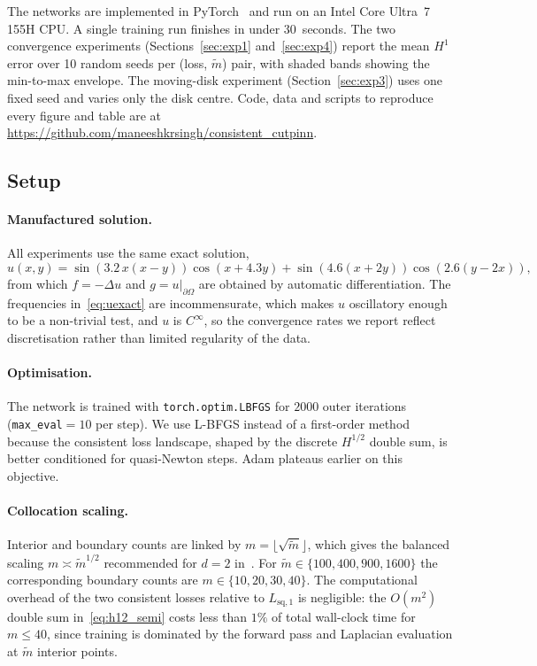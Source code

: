 \documentclass[11pt]{article}
\newcommand{\bOmg}{\partial\Omega}
\newcommand{\mtil}{\widetilde{m}}
\begin{document}
The networks are implemented in PyTorch~\cite{paszke2019pytorch}
and run on an Intel Core Ultra~7 155H CPU. A single training run
finishes in under $30$~seconds. The two convergence experiments
(Sections~\ref{sec:exp1} and~\ref{sec:exp4}) report the mean $H^1$
error over 10 random seeds per (loss, $\mtil$) pair, with shaded
bands showing the min-to-max envelope. The moving-disk experiment
(Section~\ref{sec:exp3}) uses one fixed seed and varies only the
disk centre. Code, data and scripts to reproduce every figure and
table are at
\url{https://github.com/maneeshkrsingh/consistent_cutpinn}.


\subsection{Setup}
\label{sec:setup}

\paragraph{Manufactured solution.}
All experiments use the same exact solution,
\begin{equation}\label{eq:uexact}
  u(x,y)
  = \sin\left(3.2\,x(x-y)\right)\cos\left(x+4.3y\right)
  + \sin\left(4.6(x+2y)\right)\cos\left(2.6(y-2x)\right),
\end{equation}
from which $f = -\Delta u$ and $g = u|_{\bOmg}$ are obtained by
automatic differentiation. The frequencies in~\eqref{eq:uexact}
are incommensurate, which makes $u$ oscillatory enough to be a
non-trivial test, and $u$ is $C^\infty$, so the convergence rates
we report reflect discretisation rather than limited regularity
of the data.

\paragraph{Optimisation.}
The network is trained with \texttt{torch.optim.LBFGS} for $2000$
outer iterations (\texttt{max\_eval}${}=10$ per step). We use
L-BFGS instead of a first-order method because the consistent loss
landscape, shaped by the discrete $H^{1/2}$ double sum, is better
conditioned for quasi-Newton steps. Adam plateaus earlier on this
objective.

\paragraph{Collocation scaling.}
Interior and boundary counts are linked by
$m = \lfloor\sqrt{\mtil}\rfloor$, which gives the balanced scaling
$m \asymp \mtil^{1/2}$ recommended for $d=2$ in~\cite{bonito2025}.
For $\mtil \in \{100, 400, 900, 1600\}$ the corresponding boundary
counts are $m \in \{10, 20, 30, 40\}$. The computational overhead
of the two consistent losses relative to $L_{\mathrm{sq},1}$ is
negligible: the $O(m^2)$ double sum in~\eqref{eq:h12_semi} costs
less than $1\%$ of total wall-clock time for $m \leq 40$, since
training is dominated by the forward pass and Laplacian evaluation
at $\mtil$ interior points.
\end{document}
